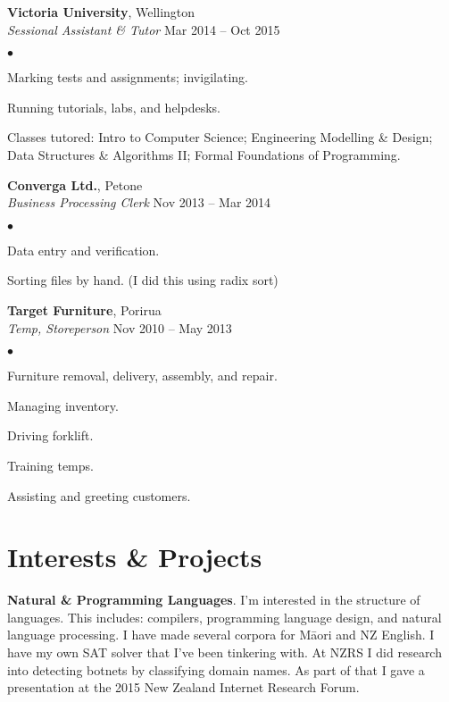 \documentclass[margin,line]{res}
\newenvironment{list2}{
  \begin{list}{$\bullet$}{%
      \setlength{\itemsep}{0in}
      \setlength{\parsep}{0in} \setlength{\parskip}{0in}
      \setlength{\topsep}{0in} \setlength{\partopsep}{0in}
      \setlength{\leftmargin}{0.2in}}}
  {\end{list}}
\begin{document}
\begin{resume}
    {\bf Victoria University}, Wellington\\
    {\em Sessional Assistant \& Tutor} \hfill {Mar 2014 -- Oct 2015}
    \begin{list2}
	\item Marking tests and assignments; invigilating.
	\item Running tutorials, labs, and helpdesks.
	\item Classes tutored: Intro to Computer Science; Engineering Modelling \& Design; Data Structures \& Algorithms 				II; Formal Foundations of Programming.
    \end{list2}

  {\bf Converga Ltd.}, Petone\\
  {\em Business Processing Clerk} \hfill {Nov 2013 -- Mar 2014}
  \begin{list2} %
	\item Data entry and verification.
	\item Sorting files by hand. (I did this using radix sort)
  \end{list2}

  {\bf Target Furniture}, Porirua\\
  {\em Temp, Storeperson} \hfill{Nov 2010 -- May 2013}
  \begin{list2} %
	\item Furniture removal, delivery, assembly, and repair. 
	\item Managing inventory.
	\item Driving forklift.
	\item Training temps.
	\item Assisting and greeting customers.
  \end{list2}


\section{\sc Interests \& Projects}

{\bf Natural \& Programming Languages}. I'm interested in the structure of languages. This includes: compilers, programming language design, and natural language processing. I have made several corpora for M\=aori and NZ English. I have my own SAT solver that I've been tinkering with. At NZRS I did research into detecting botnets by classifying domain names. As part of that I gave a presentation at the 2015 New Zealand Internet Research Forum.


\end{resume}
\end{document}
